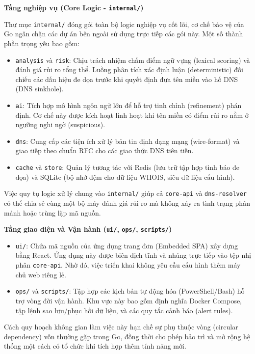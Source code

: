 \textbf{Tầng nghiệp vụ (Core Logic - \texttt{internal/})}

Thư mục \texttt{internal/} đóng gói toàn bộ logic nghiệp vụ cốt lõi, cơ chế bảo vệ của Go ngăn chặn các dự án bên ngoài sử dụng trực tiếp các gói này. Một số thành phần trọng yếu bao gồm:
\begin{itemize}
    \item \texttt{analysis} và \texttt{risk}: Chịu trách nhiệm chấm điểm ngữ vựng (lexical scori\-ng) và đánh giá rủi ro tổng thể. Luồng phân tích xác định luận (deterministic) đối chiếu các dấu hiệu đe dọa trước khi quyết định đưa tên miền vào hố DNS (DNS sinkhole).
    \item \texttt{ai}: Tích hợp mô hình ngôn ngữ lớn để hỗ trợ tinh chỉnh (refinement) phán định. Cơ chế này được kích hoạt linh hoạt khi tên miền có điểm rủi ro nằm ở ngưỡng nghi ngờ (suspicious).
    \item \texttt{dns}: Cung cấp các tiện ích xử lý bản tin định dạng mạng (wire-format) và giao tiếp theo chuẩn RFC cho các giao thức DNS tiên tiến.
    \item \texttt{cache} và \texttt{store}: Quản lý tương tác với Redis (lưu trữ tập hợp tình báo đe dọa) và SQLite (bộ nhớ đệm cho dữ liệu WHOIS, siêu dữ liệu cấu hình).
\end{itemize}
Việc quy tụ logic xử lý chung vào \texttt{internal/} giúp cả \texttt{core-api} và \texttt{dns-re\-solver} có thể chia sẻ cùng một bộ máy đánh giá rủi ro mà không xảy ra tình trạng phân mảnh hoặc trùng lặp mã nguồn.

\textbf{Tầng giao diện và Vận hành (\texttt{ui/}, \texttt{ops/}, \texttt{scripts/})}

\begin{itemize}
    \item \texttt{ui/}: Chứa mã nguồn của ứng dụng trang đơn (Embedded SPA) xây dựng bằng React. Ứng dụng này được biên dịch tĩnh và nhúng trực tiếp vào tệp nhị phân \texttt{core-api}. Nhờ đó, việc triển khai không yêu cầu cấu hình thêm máy chủ web riêng lẻ.
    \item \texttt{ops/} và \texttt{scripts/}: Tập hợp các kịch bản tự động hóa (PowerShell/Bash) hỗ trợ vòng đời vận hành. Khu vực này bao gồm định nghĩa Docker Compose, tập lệnh sao lưu/phục hồi dữ liệu, và các quy tắc cảnh báo (alert rules).
\end{itemize}

Cách quy hoạch không gian làm việc này hạn chế sự phụ thuộc vòng (circular dependency) vốn thường gặp trong Go, đồng thời cho phép bảo trì và mở rộng hệ thống một cách có tổ chức khi tích hợp thêm tính năng mới.
